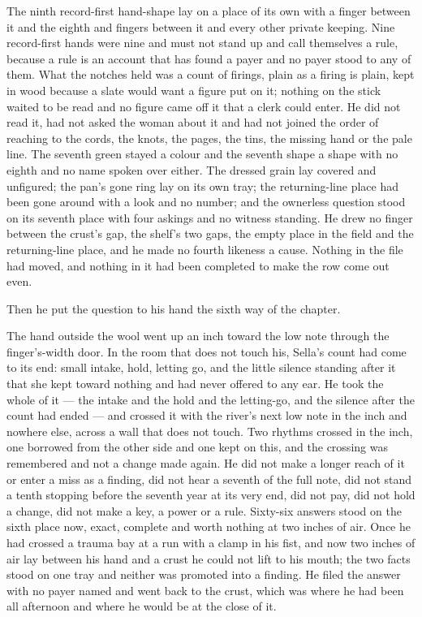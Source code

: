 The ninth record-first hand-shape lay on a place of its own with a finger between it and the eighth and fingers between it and every other private keeping. Nine record-first hands were nine and must not stand up and call themselves a rule, because a rule is an account that has found a payer and no payer stood to any of them. What the notches held was a count of firings, plain as a firing is plain, kept in wood because a slate would want a figure put on it; nothing on the stick waited to be read and no figure came off it that a clerk could enter. He did not read it, had not asked the woman about it and had not joined the order of reaching to the cords, the knots, the pages, the tins, the missing hand or the pale line. The seventh green stayed a colour and the seventh shape a shape with no eighth and no name spoken over either. The dressed grain lay covered and unfigured; the pan's gone ring lay on its own tray; the returning-line place had been gone around with a look and no number; and the ownerless question stood on its seventh place with four askings and no witness standing. He drew no finger between the crust's gap, the shelf's two gaps, the empty place in the field and the returning-line place, and he made no fourth likeness a cause. Nothing in the file had moved, and nothing in it had been completed to make the row come out even.

\scenebreak

Then he put the question to his hand the sixth way of the chapter.

The hand outside the wool went up an inch toward the low note through the finger's-width door. In the room that does not touch his, Sella's count had come to its end: small intake, hold, letting go, and the little silence standing after it that she kept toward nothing and had never offered to any ear. He took the whole of it --- the intake and the hold and the letting-go, and the silence after the count had ended --- and crossed it with the river's next low note in the inch and nowhere else, across a wall that does not touch. Two rhythms crossed in the inch, one borrowed from the other side and one kept on this, and the crossing was remembered and not a change made again. He did not make a longer reach of it or enter a miss as a finding, did not hear a seventh of the full note, did not stand a tenth stopping before the seventh year at its very end, did not pay, did not hold a change, did not make a key, a power or a rule. Sixty-six answers stood on the sixth place now, exact, complete and worth nothing at two inches of air. Once he had crossed a trauma bay at a run with a clamp in his fist, and now two inches of air lay between his hand and a crust he could not lift to his mouth; the two facts stood on one tray and neither was promoted into a finding. He filed the answer with no payer named and went back to the crust, which was where he had been all afternoon and where he would be at the close of it.

